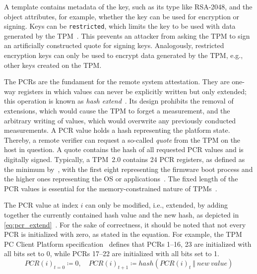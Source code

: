 A template contains metadata of the key, such as its type like RSA-2048, and the object attributes, for example, whether the key can be used for encryption or signing.
Keys can be \texttt{restricted}, which limits the key to be used with data generated by the TPM~\cite{tpm20}.
This prevents an attacker from asking the TPM to sign an artificially constructed quote for signing keys.
Analogously, restricted encryption keys can only be used to encrypt data generated by the TPM, e.g., other keys created on the TPM\@.


The \acp{PCR} are the fundament for the remote system attestation.
They are one-way registers in which values can never be explicitly written but only extended; this operation is known as \emph{hash extend}~\cite{Arthur2015}.
Its design prohibits the removal of extensions, which would cause the TPM to forget a measurement, and the arbitrary writing of values, which would overwrite any previously conducted measurements.
A PCR value holds a hash representing the platform state.
Thereby, a remote verifier can request a so-called \emph{quote} from the TPM on the host in question.
A quote contains the hash of all requested PCR values and is digitally signed.
Typically, a TPM~2.0 contains 24 PCR registers, as defined as the minimum by~\cite{tcgPcClientTpmProfile}, with the first eight representing the firmware boot process and the higher ones representing the OS or applications~\cite{tcgPcClientFirmwareProfile}.
The fixed length of the \ac{PCR} values is essential for the memory-constrained nature of TPMs~\cite{Arthur2015}.

The PCR value at index \(i\) can only be modified, i.e., extended, by adding together the currently contained hash value and the new hash, as depicted in \autoref{eq:pcr_extend}~\cite{tpm20}.
For the sake of correctness, it should be noted that not every PCR is initialized with zero, as stated in the equation.
For example, the TPM PC Client Platform specification~\cite{tcgPcClientTpmProfile} defines that PCRs 1--16, 23 are initialized with all bits set to 0, while PCRs 17--22 are initialized with all bits set to 1.
\begin{equation}
  \label{eq:pcr_extend}
PCR(i)_{t=0} \coloneqq 0,\quad PCR(i)_{t+1} \coloneqq hash(PCR(i)_t\ \Vert\ new\ value)
\end{equation}

